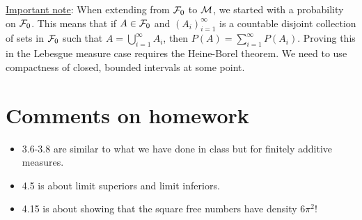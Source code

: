 \underline{Important note}: When extending from ${\mathcal{F}}_0$ to ${\mathcal{M}}$, we started with a probability on ${\mathcal{F}}_0$. This means that if $A \in {\mathcal{F}}_0$ and $(A_i)_{i=1}^\infty$ is a countable disjoint collection of sets in ${\mathcal{F}}_0$ such that $A = \bigcup_{i=1}^\infty A_i$, then $P(A) =\sum_{i=1}^\infty P(A_i)$. Proving this in the Lebesgue measure case requires the Heine-Borel theorem. We need to use compactness of closed, bounded intervals at some point.
\section{Comments on homework}
\begin{itemize}
    \item 3.6-3.8 are similar to what we have done in class but for finitely additive measures.
    
    \item 4.5 is about limit superiors and limit inferiors. 
    
    \item 4.15 is about showing that the square free numbers have density $6\pi^2$!
\end{itemize}
